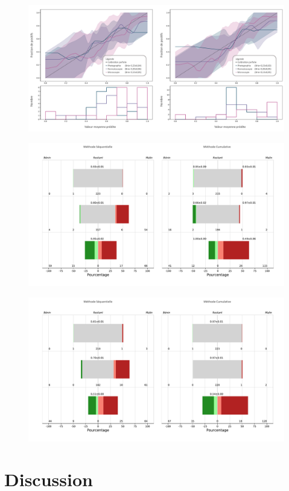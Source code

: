 \begin{figure}[H]
    \centering
    \includegraphics[width=\linewidth]{contents/chapter_8/resources/results_calibration_cumulative_calibrated.pdf}
    \caption{}
    \label{fig:results_calibration_cumulative_calibrated}
\end{figure}\par

\begin{figure}[H]
    \centering
    \includegraphics[width=\linewidth]{contents/chapter_8/resources/results_processus_weighted.pdf}
    \caption{}
    \label{fig:results_processus_weighted}
\end{figure}\par

\begin{figure}[H]
    \centering
    \includegraphics[width=\linewidth]{contents/chapter_8/resources/results_processus_malignant.pdf}
    \caption{}
    \label{fig:results_processus_malignant}
\end{figure}\par

\section{Discussion}